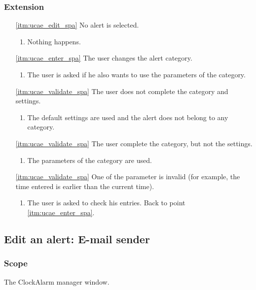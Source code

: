\subsubsection{Extension}
\begin{enumerate}
	\item[\ref{itm:ucae_edit_spa}] No alert is selected.
	\begin{enumerate}[i]
		\item Nothing happens.
	\end{enumerate}
	
	\item[\ref{itm:ucae_enter_spa}] The user changes the alert category.
	\begin{enumerate}[i]
		\item The user is asked if he also wants to use the parameters of the category.
	\end{enumerate}
	
	\item[\ref{itm:ucae_validate_spa}] The user does not complete the category and settings.
	\begin{enumerate}[i]
		\item The default settings are used and the alert does not belong to any category.
	\end{enumerate}
	
	\item[\ref{itm:ucae_validate_spa}] The user complete the category, but not the settings.
	\begin{enumerate}[i]
		\item The parameters of the category are used.
	\end{enumerate}
	
	\item[\ref{itm:ucae_validate_spa}] One of the parameter is invalid (for example, the time entered is earlier than the current time).
	\begin{enumerate}[i]
		\item The user is asked to check his entries. Back to point \ref{itm:ucae_enter_spa}.
	\end{enumerate}
\end{enumerate}

\subsection{Edit an alert: E-mail sender}

\subsubsection{Scope}
The ClockAlarm manager window.
